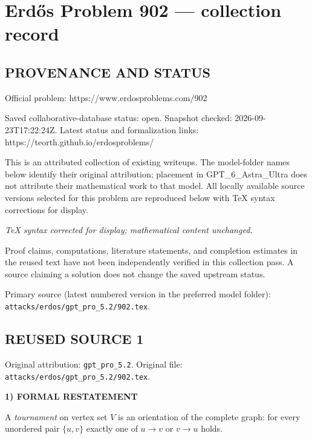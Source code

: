 \section*{Erd\H{o}s Problem 902 --- collection record}

\subsection*{PROVENANCE AND STATUS}
Official problem: https://www.erdosproblems.com/902

Saved collaborative-database status: open.
Snapshot checked: 2026-09-23T17:22:24Z.
Latest status and formalization links: https://teorth.github.io/erdosproblems/

This is an attributed collection of existing writeups. The model-folder names below identify their original attribution; placement in GPT\_6\_Astra\_Ultra does not attribute their mathematical work to that model. All locally available source versions selected for this problem are reproduced below with TeX syntax corrections for display.

\emph{TeX syntax corrected for display; mathematical content unchanged.}

Proof claims, computations, literature statements, and completion estimates in the reused text have not been independently verified in this collection pass. A source claiming a solution does not change the saved upstream status.

Primary source (latest numbered version in the preferred model folder): \texttt{attacks/erdos/gpt\_pro\_5.2/902.tex}.

\subsection*{REUSED SOURCE 1}
Original attribution: \texttt{gpt\_pro\_5.2}.
Original file: \texttt{attacks/erdos/gpt\_pro\_5.2/902.tex}.



\noindent\textbf{1) FORMAL RESTATEMENT}

A \emph{tournament} on vertex set $V$ is an orientation of the complete graph:
for every unordered pair $\{u,v\}$ exactly one of $u\to v$ or $v\to u$ holds.

